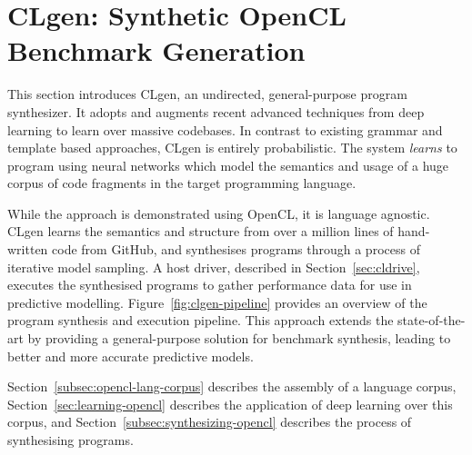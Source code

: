 \section{CLgen: Synthetic OpenCL Benchmark Generation}%
\label{sec:clgen}

This section introduces CLgen, an undirected, general-purpose program synthesizer. It adopts and augments recent advanced techniques from deep learning to learn over massive codebases. In contrast to existing grammar and template based approaches, CLgen is entirely probabilistic. The system \emph{learns} to program using neural networks which model the semantics and usage of a huge corpus of code fragments in the target programming language.

While the approach is demonstrated using OpenCL, it is language agnostic. CLgen learns the semantics and structure from over a million lines of hand-written code from GitHub, and synthesises programs through a process of iterative model sampling. A host driver, described in Section~\ref{sec:cldrive}, executes the synthesised programs to gather performance data for use in predictive modelling. Figure~\ref{fig:clgen-pipeline} provides an overview of the program synthesis and execution pipeline. This approach extends the state-of-the-art by providing a general-purpose solution for benchmark synthesis, leading to better and more accurate predictive models.

Section~\ref{subsec:opencl-lang-corpus} describes the assembly of a language corpus, Section~\ref{sec:learning-opencl} describes the application of deep learning over this corpus, and Section~\ref{subsec:synthesizing-opencl} describes the process of synthesising programs.


